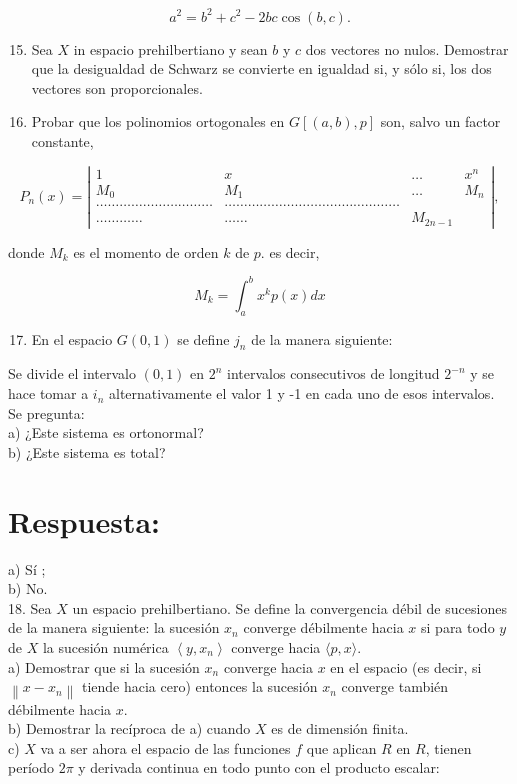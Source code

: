 \documentclass[10pt]{article}
\theoremstyle{plain}
\theoremstyle{definition}
\theoremstyle{remark}
\begin{document}
$$
a^{2}=b^{2}+c^{2}-2 b c \cos (b, c) .
$$

\begin{enumerate}
  \setcounter{enumi}{14}
  \item Sea $X$ in espacio prehilbertiano y sean $b$ y $c$ dos vectores no nulos. Demostrar que la desigualdad de Schwarz se convierte en igualdad si, y sólo si, los dos vectores son proporcionales.
  \item Probar que los polinomios ortogonales en $G[(a, b), p]$ son, salvo un factor constante,
\end{enumerate}

$$
P_{n}(x)=\left|\begin{array}{cccc}
1 & x & \ldots & x^{n} \\
M_{0} & M_{1} & \ldots & M_{n} \\
\ldots \ldots \ldots \ldots \ldots \ldots \ldots \ldots \ldots \ldots & \ldots \ldots \ldots \ldots \ldots \ldots \ldots \ldots \ldots \ldots \ldots \ldots \ldots \ldots \ldots \\
\ldots \ldots \ldots \ldots & \ldots \ldots & M_{2 n-1}
\end{array}\right|,
$$


donde $M_{k}$ es el momento de orden $k$ de $p$. es decir,

$$
M_{k}=\int_{a}^{b} x^{k} p(x) d x
$$

\begin{enumerate}
  \setcounter{enumi}{16}
  \item En el espacio $G(0,1)$ se define $j_{n}$ de la manera siguiente:
\end{enumerate}

Se divide el intervalo $(0,1)$ en $2^{n}$ intervalos consecutivos de longitud $2^{-n}$ y se hace tomar a $i_{n}$ alternativamente el valor 1 y -1 en cada uno de esos intervalos. Se pregunta:\\
a) ¿Este sistema es ortonormal?\\
b) ¿Este sistema es total?

\section*{Respuesta:}
a) Sí ;\\
b) No.\\
18. Sea $X$ un espacio prehilbertiano. Se define la convergencia débil de sucesiones de la manera siguiente: la sucesión $x_{n}$ converge débilmente hacia $x$ si para todo $y$ de $X$ la sucesión numérica $\left\langle y, x_{n}\right\rangle$ converge hacia $\langle p, x\rangle$.\\
a) Demostrar que si la sucesión $x_{n}$ converge hacia $x$ en el espacio (es decir, si $\left\|x-x_{n}\right\|$ tiende hacia cero) entonces la sucesión $x_{n}$ converge también débilmente hacia $x$.\\
b) Demostrar la recíproca de a) cuando $X$ es de dimensión finita.\\
c) $X$ va a ser ahora el espacio de las funciones $f$ que aplican $R$ en $R$, tienen período $2 \pi$ y derivada continua en todo punto con el producto escalar:
\end{document}
